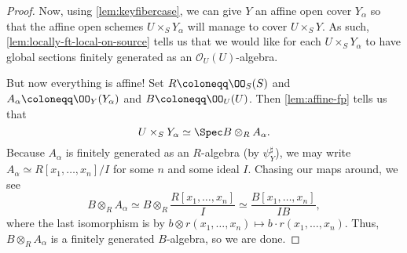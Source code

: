 \documentclass[../notes.tex]{subfiles}
\begin{document}
\begin{proof}
	Now, using \autoref{lem:keyfibercase}, we can give $Y$ an affine open cover $Y_\alpha$ so that the affine open schemes $U\times_SY_\alpha$ will manage to cover $U\times_SY$. As such, \autoref{lem:locally-ft-local-on-source} tells us that we would like for each $U\times_SY_\alpha$ to have global sections finitely generated as an $\mathcal O_U(U)$-algebra.

	But now everything is affine! Set $R\coloneqq\OO_S(S)$ and $A_\alpha\coloneqq\OO_Y(Y_\alpha)$ and $B\coloneqq\OO_U(U)$. Then \autoref{lem:affine-fp} tells us that
	\[U\times_SY_\alpha\simeq\Spec B\otimes_RA_\alpha.\]
	Because $A_\alpha$ is finitely generated as an $R$-algebra (by $\psi_Y^\sharp$), we may write $A_\alpha\simeq R[x_1,\ldots,x_n]/I$ for some $n$ and some ideal $I$. Chasing our maps around, we see
	\[B\otimes_RA_\alpha\simeq B\otimes_R\frac{R[x_1,\ldots,x_n]}I\simeq\frac{B[x_1,\ldots,x_n]}{IB},\]
	where the last isomorphism is by $b\otimes r(x_1,\ldots,x_n)\mapsto b\cdot r(x_1,\ldots,x_n)$. Thus, $B\otimes_RA_\alpha$ is a finitely generated $B$-algebra, so we are done.
\end{proof}
\end{document}
